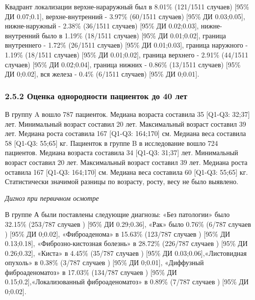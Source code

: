 \documentclass[
]{article}
\begin{document}
Квадрант локализации верхне-нараружный был в 8.01\% (121/1511 случаев)
{[}95\% ДИ 0.07;0.1{]}, верхне-внутренний - 3.97\% (60/1511 случаев)
{[}95\% ДИ 0.03;0.05{]}, нижне-наружный - 2.38\% (36/1511 случаев)
{[}95\% ДИ 0.02;0.03{]}, нижне-внутренний было в 1.19\% (18/1511
случаев) {[}95\% ДИ 0.01;0.02{]}, граница внутреннего - 1.72\% (26/1511
случаев) {[}95\% ДИ 0.01;0.03{]}, граница наружного - 1.19\% (18/1511
случаев) {[}95\% ДИ 0.01;0.02{]}, граница верхнего - 2.91\% (44/1511
случаев) {[}95\% ДИ 0.02;0.04{]}, граница нижних - 0.86\% (13/1511
случаев) {[}95\% ДИ 0;0.02{]}, вся железа - 0.4\% (6/1511 случаев)
{[}95\% ДИ 0;0.01{]}.

\hypertarget{ux43eux446ux435ux43dux43aux430-ux43eux434ux43dux43eux440ux43eux434ux43dux43eux441ux442ux438-ux43fux430ux446ux438ux435ux43dux442ux43eux43a-ux434ux43e-40-ux43bux435ux442}{%
\subsubsection{2.5.2 Оценка однородности пациенток до 40
лет}\label{ux43eux446ux435ux43dux43aux430-ux43eux434ux43dux43eux440ux43eux434ux43dux43eux441ux442ux438-ux43fux430ux446ux438ux435ux43dux442ux43eux43a-ux434ux43e-40-ux43bux435ux442}}

В группу A вошло 787 пациенток. Медиана возраста составила 35 {[}Q1-Q3:
32;37{]} лет. Минимальный возраст составил 20 лет. Максимальный возраст
составил 39 лет. Медиана роста составила 167 {[}Q1-Q3: 164;170{]} см.
Медиана веса составила 58 {[}Q1-Q3: 55;65{]} кг. Пациенток в группе B в
исследование вошло 724 пациентов. Медиана возраста составила 34
{[}Q1-Q3: 31;37{]} лет. Минимальный возраст составил 20 лет.
Максимальный возраст составил 39 лет. Медиана роста оставила 167
{[}Q1-Q3: 164;170{]} см. Медиана веса составила 60 {[}Q1-Q3: 55;65{]}
кг. Статистически значимой разницы по возрасту, росту, весу не было
выявлено.

\emph{Дигноз при первичном осмотре}

В группе А были поставлены следующие диагнозы: «Без патологии» было
32.15\% (253/787 случаев ) {[}95\% ДИ 0.29;0.36{]}, «Рак» было 0.76\%
(6/787 случаев ) {[}95\% ДИ 0;0.02{]}, «Фиброаденома» в 15.63\% (123/787
случаев ) {[}95\% ДИ 0.13;0.18{]}, «Фиброзно-кистозная болезнь» в
28.72\% (226/787 случаев ) {[}95\% ДИ 0.26;0.32{]}, «Киста» в 4.45\%
(35/787 случаев ) {[}95\% ДИ 0.03;0.06{]},«Листовидная опухоль» в 0.38\%
(3/787 случаев ) {[}95\% ДИ 0;0.01{]}, «Диффузный фиброаденоматоз» в
17.03\% (134/787 случаев ) {[}95\% ДИ 0.15;0.2{]},«Локализованный
фиброаденоматоз» в 0.89\% (7/787 случаев ) {[}95\% ДИ 0;0.02{]}.
\end{document}
